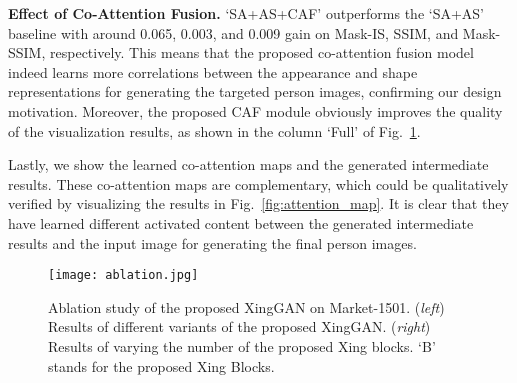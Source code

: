 \documentclass[runningheads]{llncs}
\begin{document}
\noindent \textbf{Effect of Co-Attention Fusion.}
`SA+AS+CAF' outperforms the `SA+AS' baseline with around 0.065, 0.003, and 0.009 gain on Mask-IS, SSIM, and Mask-SSIM, respectively. 
This means that the proposed co-attention fusion model indeed learns more correlations between the appearance and shape representations for generating the targeted person images, confirming our design motivation.
Moreover, the proposed CAF module obviously improves the quality of the visualization results, as shown in the column `Full' of  Fig.~\ref{fig:ablation}.

Lastly, we show the learned co-attention maps and the generated intermediate results.
These co-attention maps are complementary, which could be qualitatively verified by visualizing the results in Fig.~\ref{fig:attention_map}. 
It is clear that they have learned different activated content between the generated intermediate results and the input image for generating the final person images.

\begin{figure}[!t]
	\centering
	\texttt{[image: ablation.jpg]}
	\caption{Ablation study of the proposed XingGAN on Market-1501. (\textit{left}) Results of different variants of the proposed XingGAN. (\textit{right}) Results of varying the number of the proposed Xing blocks. `B' stands for the proposed Xing Blocks.}
	\label{fig:ablation}
\end{figure}
\end{document}
